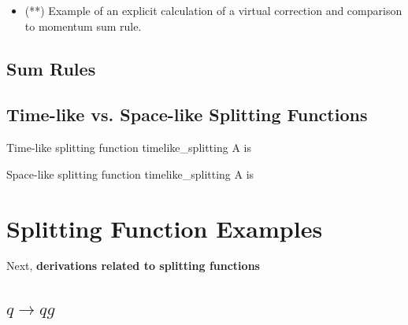 \begin{subappendices}
\begin{itemize}
    \item
    (**) Example of an explicit calculation of a virtual correction and comparison to momentum sum rule.
\end{itemize}




\subsection{Sum Rules}


\subsection{Time-like vs. Space-like Splitting Functions}

\begin{definitionbox}{
    Time-like splitting function
}{timelike_splitting}
    A  is 
\end{definitionbox}



\begin{definitionbox}{
    Space-like splitting function
}{timelike_splitting}
    A  is 
\end{definitionbox}



\section{Splitting Function Examples}
Next, \textbf{derivations related to splitting functions}


\subsection{
\texorpdfstring{\(q \to q g\)}
{Quark to Quark plus Gluon}
}


\end{subappendices}
